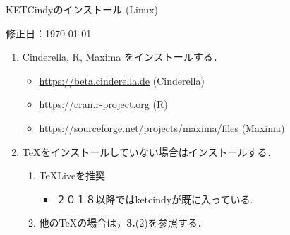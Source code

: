 \documentclass{ujarticle}
\begin{document}
\begin{center}
KETCindyのインストール (Linux)
\end{center}

\hfill 修正日：\today

\begin{enumerate}[\bf\large 1.]
\item Cinderella, R, Maxima をインストールする．
 \begin{itemize}
 \item \url{https://beta.cinderella.de}  (Cinderella)
 \item \url{https://cran.r-project.org}   (R)
 \item \url{https://sourceforge.net/projects/maxima/files}  (Maxima)
 \end{itemize}

\item TeXをインストールしていない場合はインストールする．
 \begin{enumerate}[(1)]
 \item TeXLiveを推奨
    \begin{itemize}
    \item ２０１８以降ではketcindyが既に入っている.
    \end{itemize}
 \item 他のTeXの場合は，{\bf 3.}(2)を参照する．
 \end{enumerate}


\end{enumerate}
\end{document}
